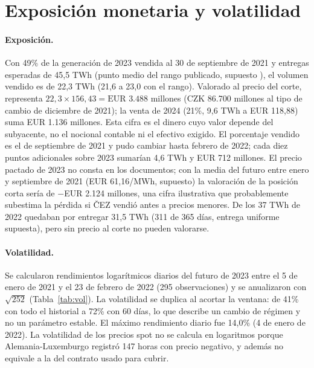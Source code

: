 \documentclass[11pt,letterpaper]{article}
\theoremstyle{plain}
\theoremstyle{definition}
\theoremstyle{remark}
\numberwithin{equation}{section}
\begin{document}

\section{Exposición monetaria y volatilidad}

\paragraph{Exposición.} 
Con 49\% de la generación de 2023 vendida al 30 de septiembre de 2021 y entregas esperadas de
 45,5 TWh (punto medio del rango publicado, supuesto ), el volumen vendido es de 22,3 TWh 
 (21,6 a 23,0 con el rango). Valorado al precio del corte, representa 
 $22{,}3\times156{,}43=\text{EUR }3.488$ millones (CZK 86.700 millones al tipo de cambio 
 de diciembre de 2021); la venta de 2024 (21\%, 9,6 TWh a EUR 118,88) suma EUR 1.136 millones. 
 Esta cifra es el dinero cuyo valor depende del subyacente, no el nocional contable ni 
 el efectivo exigido. El porcentaje vendido es el de septiembre de 2021 y pudo cambiar 
 hasta febrero de 2022; cada diez puntos adicionales sobre 2023 sumarían 4,6 TWh y 
 EUR 712 millones. El precio pactado de 2023 no consta en los documentos; con la media 
 del futuro entre enero y septiembre de 2021 (EUR 61,16/MWh, supuesto) la valoración 
 de la posición corta sería de $-$EUR 2.124 millones, una cifra ilustrativa que 
 probablemente subestima la pérdida si ČEZ vendió antes a precios menores. 
 De los 37 TWh de 2022 quedaban por entregar 31,5 TWh (311 de 365 días, entrega uniforme 
 supuesta), pero sin precio al corte no pueden valorarse.

\paragraph{Volatilidad.} Se calcularon rendimientos logarítmicos diarios del futuro de 
2023 entre el 5 de enero de 2021 y el 23 de febrero de 2022 (295 observaciones) y se 
anualizaron con $\sqrt{252}$ (Tabla~\ref{tab:vol}). La volatilidad se duplica al acortar 
la ventana: de 41\% con todo el historial a 72\% con 60 días, lo que describe un cambio 
de régimen y no un parámetro estable. El máximo rendimiento diario fue 14,0\% (4 de enero 
de 2022). La volatilidad de los precios spot no se calcula en logaritmos porque 
Alemania-Luxemburgo registró 147 horas con precio negativo, y además no equivale a la del 
contrato usado para cubrir.
\end{document}
